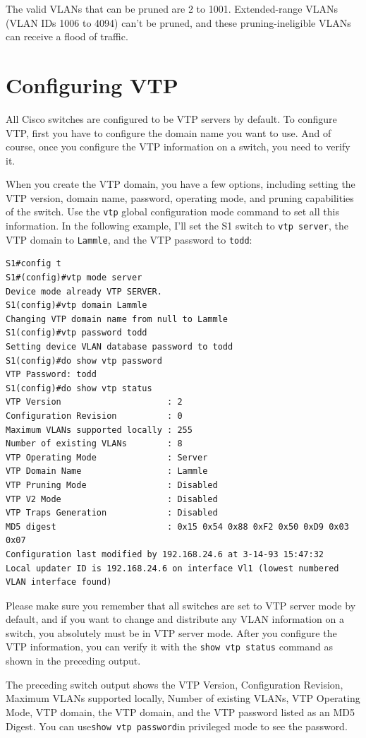 The valid VLANs that can be pruned are 2 to 1001. Extended-range VLANs
(VLAN IDs 1006 to 4094) can't be pruned, and these pruning-ineligible
VLANs can receive a flood of traffic.

\section{Configuring VTP}

All Cisco switches are configured to be VTP servers by default. To
configure VTP, first you have to configure the domain name you want to
use. And of course, once you configure the VTP information on a switch,
you need to verify it.

When you create the VTP domain, you have a few options, including
setting the VTP version, domain name, password, operating mode, and
pruning capabilities of the switch. Use the \texttt{vtp} global
configuration mode command to set all this information. In the following
example, I'll set the S1 switch to \texttt{vtp\ server}, the VTP domain
to \texttt{Lammle}, and the VTP password to \texttt{todd}:

\begin{verbatim}
S1#config t
S1#(config)#vtp mode server
Device mode already VTP SERVER.
S1(config)#vtp domain Lammle
Changing VTP domain name from null to Lammle
S1(config)#vtp password todd
Setting device VLAN database password to todd
S1(config)#do show vtp password
VTP Password: todd
S1(config)#do show vtp status
VTP Version                     : 2
Configuration Revision          : 0
Maximum VLANs supported locally : 255
Number of existing VLANs        : 8
VTP Operating Mode              : Server
VTP Domain Name                 : Lammle
VTP Pruning Mode                : Disabled
VTP V2 Mode                     : Disabled
VTP Traps Generation            : Disabled
MD5 digest                      : 0x15 0x54 0x88 0xF2 0x50 0xD9 0x03 0x07
Configuration last modified by 192.168.24.6 at 3-14-93 15:47:32
Local updater ID is 192.168.24.6 on interface Vl1 (lowest numbered VLAN interface found)
\end{verbatim}

Please make sure you remember that all switches are set to VTP server
mode by default, and if you want to change and distribute any VLAN
information on a switch, you absolutely must be in VTP server mode.
After you configure the VTP information, you can verify it with the
\texttt{show\ vtp\ status} command as shown in the preceding output.

The preceding switch output shows the VTP Version, Configuration
Revision, Maximum VLANs supported locally, Number of existing VLANs, VTP
Operating Mode, VTP domain, the VTP domain, and the VTP password listed
as an MD5 Digest. You can use\texttt{show\ vtp\ password}in privileged
mode to see the password.

